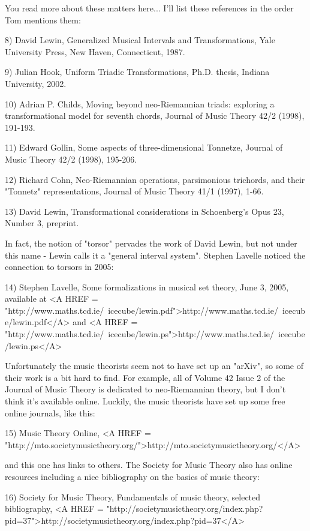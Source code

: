 You read more about these matters here... I'll list these references 
in the order Tom mentions them:

8) David Lewin, Generalized Musical Intervals and Transformations,
Yale University Press, New Haven, Connecticut, 1987.

9) Julian Hook, Uniform Triadic Transformations, Ph.D. thesis, Indiana 
University, 2002.

10) Adrian P. Childs, Moving beyond neo-Riemannian triads: exploring 
a transformational model for seventh chords, Journal of Music
Theory 42/2 (1998), 191-193.

11) Edward Gollin, Some aspects of three-dimensional Tonnetze,
Journal of Music Theory 42/2 (1998), 195-206.

12) Richard Cohn, Neo-Riemannian operations, parsimonious 
trichords, and their "Tonnetz" representations, Journal of 
Music Theory 41/1 (1997), 1-66.

13) David Lewin, Transformational considerations in Schoenberg's 
Opus 23, Number 3, preprint. 

In fact, the notion of "torsor" pervades the work of David
Lewin, but not under this name - Lewin calls it a "general
interval system".  Stephen Lavelle noticed the connection to
torsors in 2005:

14) Stephen Lavelle, Some formalizations in musical set theory,
June 3, 2005, available at <A HREF = "http://www.maths.tcd.ie/~icecube/lewin.pdf">http://www.maths.tcd.ie/~icecube/lewin.pdf</A>
and <A HREF = "http://www.maths.tcd.ie/~icecube/lewin.ps">http://www.maths.tcd.ie/~icecube/lewin.ps</A>

Unfortunately the music theorists seem not to have set up 
an "arXiv", so some of their work is a bit hard to find.
For example, all of Volume 42 Issue 2 of the Journal of Music 
Theory is dedicated to neo-Riemannian theory, but I don't
think it's available online.  Luckily, the music theorists have 
set up some free online journals, like this:

15) Music Theory Online, <A HREF = "http://mto.societymusictheory.org/">http://mto.societymusictheory.org/</A>

and this one has links to others.  The Society for Music Theory 
also has online resources including a nice bibliography on the 
basics of music theory:

16) Society for Music Theory, Fundamentals of music theory,
selected bibliography, 
<A HREF = "http://societymusictheory.org/index.php?pid=37">http://societymusictheory.org/index.php?pid=37</A>

